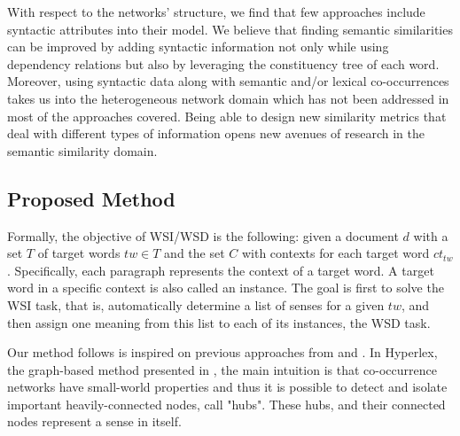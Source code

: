 With respect to the networks' structure, we find that few approaches include syntactic attributes into their model. We believe that finding semantic similarities can be improved by adding syntactic information not only  while using dependency relations but also by leveraging the constituency tree of each word. Moreover, using syntactic data along with semantic and/or lexical co-occurrences takes us into the heterogeneous network domain which has not been addressed in most of the approaches covered.
Being able to design new similarity metrics that deal with different types of information opens new avenues of research in the semantic similarity domain. %




\subsection{Proposed Method}
	


Formally, the objective of WSI/WSD is the following: given a document $d$ with a set $T$ of  target words $tw \in T$ and the set $C$ with contexts for each target word $ct_{tw}$. 
Specifically, each paragraph represents the context  of a target word. A target word in a specific context is also called an instance.
The goal is first to solve the WSI task, that is, automatically determine a list of senses for a given $tw$, and then assign one meaning from this list to each of its instances, the WSD task.
%


Our method follows is inspired on previous approaches from \cite{2004.Veronis} and \cite{2007.Klapaftis.UOY}. In Hyperlex,  the graph-based  method presented  in \cite{2004.Veronis}, the main intuition is that co-occurrence networks have small-world properties and thus it is possible to detect and isolate important heavily-connected nodes, call "hubs". These hubs, and their connected nodes represent a sense in itself. 

